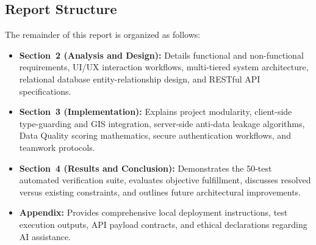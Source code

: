 \subsection{Report Structure}
The remainder of this report is organized as follows:
\begin{itemize}
  \item \textbf{Section~2 (Analysis and Design):} Details functional and non-functional requirements, UI/UX interaction workflows, multi-tiered system architecture, relational database entity-relationship design, and RESTful API specifications.
  \item \textbf{Section~3 (Implementation):} Explains project modularity, client-side type-guarding and GIS integration, server-side anti-data leakage algorithms, Data Quality scoring mathematics, secure authentication workflows, and teamwork protocols.
  \item \textbf{Section~4 (Results and Conclusion):} Demonstrates the 50-test automated verification suite, evaluates objective fulfillment, discusses resolved versus existing constraints, and outlines future architectural improvements.
  \item \textbf{Appendix:} Provides comprehensive local deployment instructions, test execution outputs, API payload contracts, and ethical declarations regarding AI assistance.
\end{itemize}
